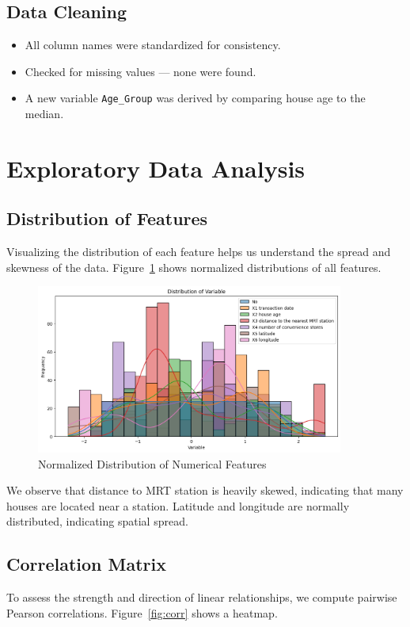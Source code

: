 \documentclass[12pt]{article}
\begin{document}
\subsection{Data Cleaning}
\begin{itemize}
    \item All column names were standardized for consistency.
    \item Checked for missing values --- none were found.
    \item A new variable \texttt{Age\_Group} was derived by comparing house age to the median.
\end{itemize}

\section{Exploratory Data Analysis}

\subsection{Distribution of Features}
Visualizing the distribution of each feature helps us understand the spread and skewness of the data. Figure~\ref{fig:dist} shows normalized distributions of all features.

\begin{figure}[H]
    \centering
    \includegraphics[width=0.9\textwidth]{normalized_distribution.png}
    \caption{Normalized Distribution of Numerical Features}
    \label{fig:dist}
\end{figure}

We observe that distance to MRT station is heavily skewed, indicating that many houses are located near a station. Latitude and longitude are normally distributed, indicating spatial spread.

\subsection{Correlation Matrix}
To assess the strength and direction of linear relationships, we compute pairwise Pearson correlations. Figure~\ref{fig:corr} shows a heatmap.
\end{document}
